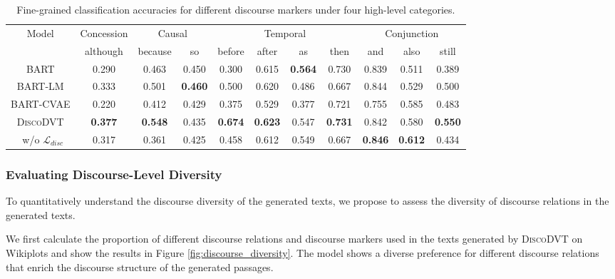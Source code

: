 \documentclass[11pt]{article}
\begin{document}
\begin{table}[t!]
    \centering
    \small
    \begin{tabular}{c|c|cc|cccc|ccc}
    \toprule[1pt]
    \multirow{2}{*}{Model} & \multicolumn{1}{c}{Concession} & \multicolumn{2}{c}{Causal} & \multicolumn{4}{c}{Temporal} & \multicolumn{3}{c}{Conjunction} \\
    \cmidrule(lr){2-2} \cmidrule(lr){3-4} \cmidrule(lr){5-8} \cmidrule(lr){9-11}
     & although & because & so & before & after & as & then & and & also & still \\
     \midrule[0.5pt]
    BART & 0.290 & 0.463 & 0.450 & 0.300 & 0.615 & \textbf{0.564} & 0.730 & 0.839 & 0.511 & 0.389\\
    BART-LM & 0.333 & 0.501 & \textbf{0.460} & 0.500 & 0.620 & 0.486 & 0.667 & 0.844 & 0.529 & 0.500 \\
    BART-CVAE & 0.220 & 0.412 & 0.429 & 0.375 & 0.529 & 0.377 & 0.721 & 0.755 & 0.585 & 0.483 \\
    \midrule[0.5pt]
    \textsc{DiscoDVT} & \textbf{0.377} & \textbf{0.548} & 0.435 & \textbf{0.674} & \textbf{0.623} & 0.547 & \textbf{0.731} & 0.842 & 0.580 & \textbf{0.550} \\
    \ w/o $\mathcal{L}_{disc}$ & 0.317 & 0.361 & 0.425 & 0.458 & 0.612 & 0.549 & 0.667 & \textbf{0.846} & \textbf{0.612} & 0.434 \\
    \bottomrule[1pt]
    \end{tabular}
    \caption{Fine-grained classification accuracies for different discourse markers under four high-level categories.}
    \label{tab:acc_markers}
\end{table}




\subsubsection{Evaluating Discourse-Level Diversity}\label{sec:discourse_diversity} 


To quantitatively understand the discourse diversity of the generated texts, we propose to assess the diversity of discourse relations in the generated texts. 

We first calculate the proportion of different discourse relations and discourse markers used in the texts generated by \textsc{DiscoDVT} on Wikiplots and show the results in Figure \ref{fig:discourse_diversity}. The model shows a diverse preference for different discourse relations that enrich the discourse structure of the generated passages. 
\end{document}
